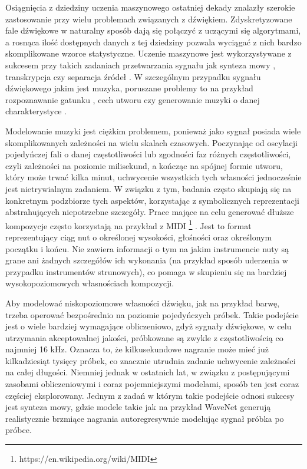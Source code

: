 \documentclass[magisterska]{pracamgr}
\renewcommand{\cite}{\citep}
\begin{document}
Osiągnięcia z dziedziny uczenia maszynowego ostatniej dekady znalazły szerokie zastosowanie przy wielu
problemach związanych z dźwiękiem. Zdyskretyzowane fale dźwiękowe w naturalny sposób dają się połączyć
z uczącymi się algorytmami, a rosnąca ilość dostępnych danych z tej dziedziny pozwala wyciągać z nich
bardzo skomplikowane wzorce statystyczne. Uczenie maszynowe jest wykorzystywane z sukcesem przy takich
zadaniach przetwarzania sygnału jak synteza mowy \cite{shen2018natural} \cite{donahue2021endtoend},
transkrypcja \cite{baevski2020wav2vec} czy separacja źródeł \cite{defossez2021hybrid}. W szczególnym
przypadku sygnału dźwiękowego jakim jest muzyka, poruszane problemy to na przykład rozpoznawanie
gatunku \cite{castellon2021codified}, cech utworu \cite{castellon2021codified} czy generowanie muzyki o
danej charakterystyce \cite{dhariwal2020jukebox}.

Modelowanie muzyki jest ciężkim problemem, ponieważ jako sygnał posiada wiele skomplikowanych
zależności na wielu skalach czasowych. Poczynając od oscylacji pojedyńczej fali o danej częstotliwości
lub zgodności faz różnych częstotliwości, czyli zależności na poziomie milisekund, a kończąc na spójnej
formie utworu, który może trwać kilka minut, uchwycenie wszystkich tych własności jednocześnie jest
nietrywialnym zadaniem. W związku z tym, badania często skupiają się na konkretnym podzbiorze tych
aspektów, korzystając z symbolicznych reprezentacji abstrahujących niepotrzebne szczegóły. Prace
mające na celu generować dłuższe kompozycje często korzystają na przykład z MIDI \footnote{https://en.wikipedia.org/wiki/MIDI}
\cite{huang2018music}. Jest to format reprezentujący ciąg nut o określonej wysokości, głośności oraz
określonym początku i końcu. Nie zawiera informacji o tym na jakim instrumencie nuty są grane ani
żadnych szczegółów ich wykonania (na przykład sposób uderzenia w przypadku instrumentów strunowych),
co pomaga w skupieniu się na bardziej wysokopoziomowych własnościach kompozycji.

Aby modelować niskopoziomowe własności dźwięku, jak na przykład barwę, trzeba operować bezpośrednio
na poziomie pojedyńczych próbek. Takie podejście jest o wiele bardziej wymagające obliczeniowo, gdyż
sygnały dźwiękowe, w celu utrzymania akceptowalnej jakości, próbkowane są zwykle z częstotliwością co
najmniej 16 kHz. Oznacza to, że kilkusekundowe nagranie może mieć już kilkadziesiąt tysięcy próbek,
co znacznie utrudnia zadanie uchwycenie zależności na całej długości. Niemniej jednak w ostatnich
lat, w związku z postępującymi zasobami obliczeniowymi i coraz pojemniejszymi modelami, sposób ten
jest coraz częściej eksplorowany. Jednym z zadań w którym takie podejście odnosi sukcesy jest synteza
mowy, gdzie modele takie jak na przykład WaveNet \cite{oord2016wavenet} generują realistycznie brzmiące
nagrania autoregresywnie modelując sygnał próbka po próbce.
\end{document}
